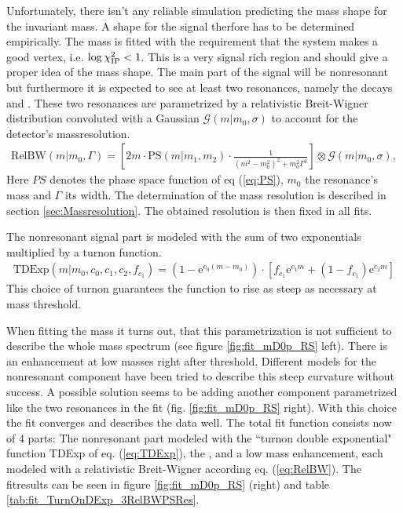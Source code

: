 Unfortunately, there isn't any reliable simulation predicting the mass shape for the \Dz\proton invariant mass. 
A shape for the signal therfore has to be determined empirically. The \Dz\proton mass is fitted with the requirement that the \Dz\proton\muon system makes a good vertex, i.e. $\log \chi^2_{\text{IP}} < 1$. 
This is a very signal rich region and should give a proper idea of the mass shape. 
The main part of the signal will be nonresonant but furthermore it is expected to see at least two resonances, namely the decays \decay{\LcResI}{\Dz\proton} and \decay{\LcResII}{\Dz\proton}.
These two resonances are parametrized by a relativistic Breit-Wigner distribution convoluted with a Gaussian $\mathcal{G}(m|m_0,\sigma)$ to account for the detector's massresolution.
\begin{align}
    \text{RelBW}(m|m_0,\Gamma) = \left[ 2m \cdot \text{PS}(m|m_1,m_2) \cdot \frac{1}{(m^2 -m_0^2)^2 + m_0^2\Gamma^2} \right] \otimes \mathcal{G}(m|m_0,\sigma), \label{eq:RelBW}
\end{align}
 Here $PS$ denotes the phase space function of eq (\ref{eq:PS}), $m_0$ the resonance's mass and $\Gamma$ its width.
 The determination of the mass resolution is described in section \ref{sec:Massresolution}. 
 The obtained resolution is then fixed in all fits.

The nonresonant signal part is modeled with the sum of two exponentials multiplied by a turnon function.
\begin{align}
    \text{TDExp}(m|m_0, c_0, c_1, c_2, f_{c_1}) = \left( 1 - \mathrm{e}^{c_0(m-m_0)} \right) \cdot \left[ f_{c_1} \mathrm{e}^{c_1m} + (1-f_{c_1}) \mathrm{e}^{c_2m} \right] \label{eq:TDExp}
\end{align}
This choice of turnon guarantees the function to rise as steep as necessary at \Dz\proton mass threshold.

When fitting the \Dz\proton mass it turns out, that this parametrization is not sufficient to describe the whole mass spectrum (see figure \ref{fig:fit_mD0p_RS} left). 
There is an enhancement at low \Dz\proton masses right after threshold.
Different models for the nonresonant component have been tried to describe this steep curvature without success.
A possible solution seems to be adding another component parametrized like the two resonances in the fit (fig. \ref{fig:fit_mD0p_RS} right). 
With this choice the fit converges and describes the data well.
The total fit function consists now of 4 parts: The nonresonant part modeled with the ``turnon double exponential" function TDExp of eq. (\ref{eq:TDExp}), the \LcResI, \LcResII and a low mass enhancement, each modeled with a relativistic Breit-Wigner according eq. (\ref{eq:RelBW}). 
The fitresults can be seen in figure \ref{fig:fit_mD0p_RS} (right) and table \ref{tab:fit_TurnOnDExp_3RelBWPSRes}.

